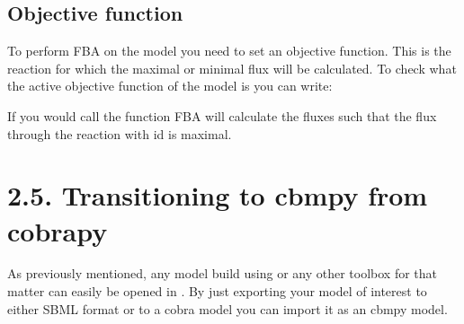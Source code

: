 \documentclass[letterpaper,10pt,english]{sphinxmanual}
\begin{document}
\begin{sphinxVerbatim}[commandchars=\\\{\}]
   

 
 
\end{sphinxVerbatim}


\subsection{Objective function}
\label{\detokenize{2_getting_started/home:objective-function}}
\sphinxAtStartPar
To perform FBA on the model you need to set an objective function. This is the reaction for which the maximal or minimal flux will
be calculated.
To check what the active objective function of the model is you can write:

\begin{sphinxVerbatim}[commandchars=\\\{\}]
  

  
\end{sphinxVerbatim}

\sphinxAtStartPar
If you would call the function  FBA will calculate the fluxes such that the flux through the
reaction with id  is maximal.


\section{2.5. Transitioning to cbmpy from cobrapy}
\label{\detokenize{2_getting_started/home:transitioning-to-cbmpy-from-cobrapy}}
\sphinxAtStartPar
As previously mentioned, any model build using  or any other toolbox for that matter can easily be opened in . By
just exporting your model of interest to either SBML format or to a cobra model you can import it as an cbmpy model.
\end{document}
